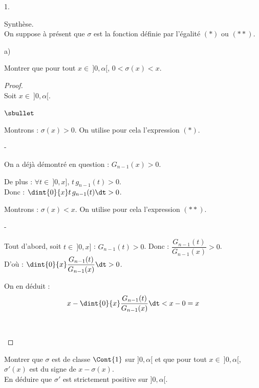 \documentclass[11pt]{article}%
\begin{document}
\begin{noliste}{1.}
  \item Synthèse.\\
  On suppose à présent que $\sigma$ est la fonction définie par 
  l'égalité $(*)$ ou $(**)$.
  \begin{noliste}{a)}
    \setlength{\itemsep}{2mm}
    \item Montrer que pour tout $x \in \ ]0, \alpha[$, $0 < \sigma(x)
    <x$.
    
    \begin{proof}~\\
      Soit $x \in \ ]0,\alpha[$.
      \begin{noliste}{$\sbullet$}
	\item Montrons : $\sigma(x) >0$. On utilise pour cela 
	l'expression $(*)$.
	\begin{noliste}{-}
	  \item On a déjà démontré en question  : 
	  $G_{n-1}(x) >0$.
	  
	  \item De plus : $\forall t \in \ ]0,x]$, $t \, g_{n-1}(t)
	  >0$.\\[.1cm]
	  Donc : $\dint{0}{x} t \, g_{n-1}(t) \dt >0$.
	\end{noliste}
	
	\item Montrons : $\sigma(x) < x$. On utilise pour cela 
	l'expression $(**)$.
	\begin{noliste}{-}
	  \item Tout d'abord, soit $t \in \ ]0,x]$ : 
	  $G_{n-1}(t) >0$. Donc : $\dfrac{G_{n-1}(t)}{G_{n-1}(x)}
	  >0$.\\[.1cm]
	  D'où : $\dint{0}{x} \dfrac{G_{n-1}(t)}{G_{n-1}(x)} \dt >0$.
	  
	  \item On en déduit :
	  \[
	    x - \dint{0}{x} \dfrac{G_{n-1}(t)}{G_{n-1}(x)} \dt
	    < x-0 = x
	  \]
	\end{noliste}
	~\\[-1.6cm]
      \end{noliste}
    \end{proof}

    
    \item Montrer que $\sigma$ est de classe $\Cont{1}$ sur $]0,\alpha[$
    et que pour tout $x \in \ ]0,\alpha[$, $\sigma'(x)$ est du signe 
    de $x- \sigma(x)$.\\
    En déduire que $\sigma'$ est strictement positive sur $]0,\alpha[$.
    

\end{noliste}
\end{noliste}
\end{document}
